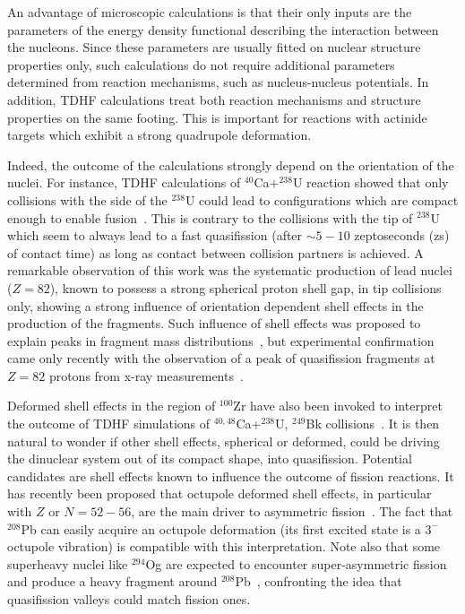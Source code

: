 \documentclass[reprint,aps,prc,twocolumn,floatfix,10pt]{revtex4-2}
\begin{document}
An advantage of microscopic calculations is that their only inputs are the parameters of the energy density functional describing the interaction between the nucleons.
Since these parameters are usually fitted on nuclear structure properties only, such calculations do not require additional parameters determined from reaction mechanisms, such as nucleus-nucleus potentials.
In addition, TDHF calculations treat both reaction mechanisms and structure properties on the same footing.
This is important for reactions with actinide targets which exhibit a strong quadrupole deformation.

Indeed, the outcome of the calculations strongly depend on the orientation of the nuclei.
For instance, TDHF calculations of $^{40}$Ca$+^{238}$U reaction showed that only collisions with the side of the $^{238}$U could lead to configurations which are compact enough to enable fusion~\cite{wakhle2014}.
This is contrary to the collisions with the tip of $^{238}$U which seem to always lead to a fast quasifission (after $\sim5-10$ zeptoseconds (zs) of contact time) as long as contact between collision partners is achieved.
A remarkable observation of this work was the systematic production of lead nuclei ($Z=82$), known to possess a strong spherical proton shell gap, in tip collisions only, showing a strong influence of orientation dependent shell effects in the production of the fragments.
Such influence of shell effects was proposed to explain peaks in fragment mass distributions~\cite{itkis2004,nishio2008,wakhle2014}, but experimental confirmation came only recently with the observation of a peak of quasifission fragments at $Z=82$ protons from x-ray measurements~\cite{morjean2017}.

Deformed shell effects in the region of $^{100}$Zr have also been invoked to interpret the outcome of TDHF simulations of $^{40,48}$Ca+$^{238}$U, $^{249}$Bk collisions~\cite{oberacker2014,umar2016}.
It is then natural to wonder if other shell effects, spherical or deformed, could be driving the dinuclear system out of its compact shape, into quasifission.
Potential candidates are shell effects known to influence the outcome of fission reactions.
It has recently been proposed that octupole deformed shell effects, in particular with $Z$ or $N=52-56$, are the main driver to asymmetric fission~\cite{scamps2018,scamps2019}.
The fact that $^{208}$Pb can easily acquire an octupole deformation (its first excited state is a $3^-$ octupole vibration) is compatible with this interpretation.
Note also that some superheavy nuclei like $^{294}$Og are expected to encounter super-asymmetric fission and produce a heavy fragment around $^{208}$Pb~\cite{poenaru2018,warda2018,matheson2019,zhang2018b}, confronting the idea that quasifission valleys could match fission ones.
\end{document}
